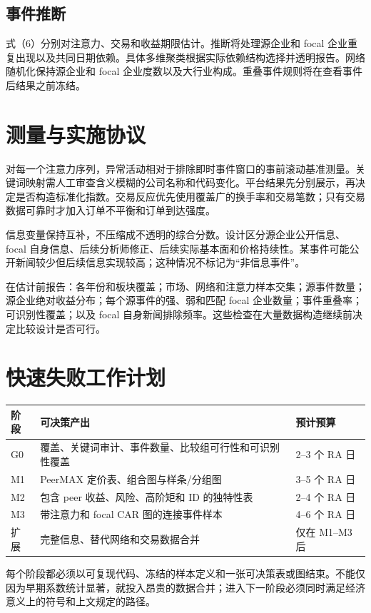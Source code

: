 \documentclass[UTF8,a4paper,11pt]{ctexart}
\begin{document}
\subsection{事件推断}
式（6）分别对注意力、交易和收益期限估计。推断将处理源企业和 focal 企业重复出现以及共同日期依赖。具体多维聚类根据实际依赖结构选择并透明报告。网络随机化保持源企业和 focal 企业度数以及大行业构成。重叠事件规则将在查看事件后结果之前冻结。

\section{测量与实施协议}
对每一个注意力序列，异常活动相对于排除即时事件窗口的事前滚动基准测量。关键词映射需人工审查含义模糊的公司名称和代码变化。平台结果先分别展示，再决定是否构造标准化指数。交易反应优先使用覆盖广的换手率和交易笔数；只有交易数据可靠时才加入订单不平衡和订单到达强度。

信息变量保持互补，不压缩成不透明的综合分数。设计区分源企业公开信息、focal 自身信息、后续分析师修正、后续实际基本面和价格持续性。某事件可能公开新闻较少但后续信息实现较高；这种情况不标记为“非信息事件”。

在估计前报告：各年份和板块覆盖；市场、网络和注意力样本交集；源事件数量；源企业绝对收益分布；每个源事件的强、弱和匹配 focal 企业数量；事件重叠率；可识别性覆盖；以及 focal 自身新闻排除频率。这些检查在大量数据构造继续前决定比较设计是否可行。

\section{快速失败工作计划}
\begin{center}
\begin{tabular}{p{}p{}p{}}
\toprule
阶段 & 可决策产出 & 预计预算\\
\midrule
G0 & 覆盖、关键词审计、事件数量、比较组可行性和可识别性覆盖 & 2--3 个 RA 日\\
M1 & PeerMAX 定价表、组合图与样条/分组图 & 3--5 个 RA 日\\
M2 & 包含 peer 收益、风险、高阶矩和 ID 的独特性表 & 2--4 个 RA 日\\
M3 & 带注意力和 focal CAR 图的连接事件样本 & 4--6 个 RA 日\\
扩展 & 完整信息、替代网络和交易数据合并 & 仅在 M1--M3 后\\
\bottomrule
\end{tabular}
\end{center}

每个阶段都必须以可复现代码、冻结的样本定义和一张可决策表或图结束。不能仅因为早期系数统计显著，就投入昂贵的数据合并；进入下一阶段必须同时满足经济意义上的符号和上文规定的路径。
\end{document}
